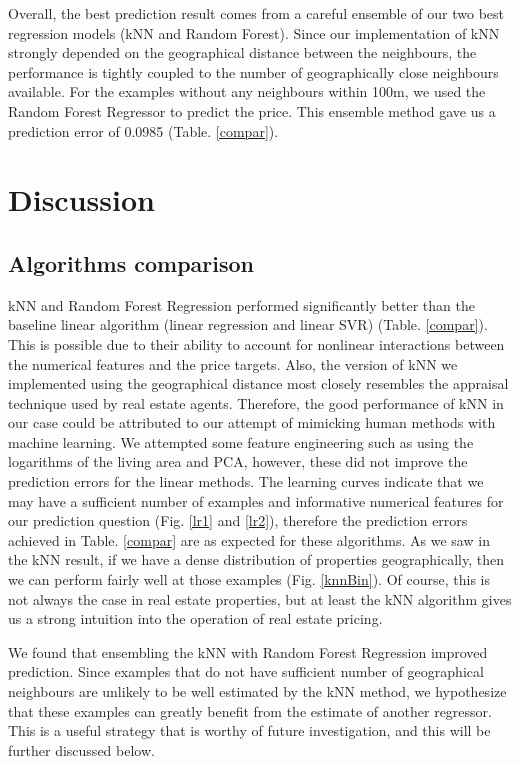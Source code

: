\documentclass[conference]{IEEEtran}
\begin{document}
Overall, the best prediction result comes from a careful ensemble of our two best regression models (kNN and Random Forest). Since our implementation of kNN strongly depended on the geographical distance between the neighbours, the performance is tightly coupled to the number of geographically close neighbours available. For the examples without any neighbours within 100m, we used the Random Forest Regressor to predict the price. This ensemble method gave us a prediction error of 0.0985 (Table. \ref{compar}). 

\section{Discussion}
\subsection{Algorithms comparison}
kNN and Random Forest Regression performed significantly better than the baseline linear algorithm (linear regression and linear SVR) (Table. \ref{compar}). This is possible due to their ability to account for nonlinear interactions between the numerical features and the price targets. Also, the version of kNN we implemented using the geographical distance most closely resembles the appraisal technique used by real estate agents. Therefore, the good performance of kNN in our case could be attributed to our attempt of mimicking human methods with machine learning. We attempted some feature engineering such as using the logarithms of the living area and PCA, however, these did not improve the prediction errors for the linear methods. The learning curves indicate that we may have a sufficient number of examples and informative numerical features for our prediction question (Fig. \ref{lr1} and \ref{lr2}), therefore the prediction errors achieved in Table. \ref{compar} are as expected for these algorithms. As we saw in the kNN result, if we have a dense distribution of properties geographically, then we can perform fairly well at those examples (Fig. \ref{knnBin}). Of course, this is not always the case in real estate properties, but at least the kNN algorithm gives us a strong intuition into the operation of real estate pricing.

We found that ensembling the kNN with Random Forest Regression improved prediction. Since examples that do not have sufficient number of geographical neighbours are unlikely to be well estimated by the kNN method, we hypothesize that these examples can greatly benefit from the estimate of another regressor. This is a useful strategy that is worthy of future investigation, and this will be further discussed below.
\end{document}
